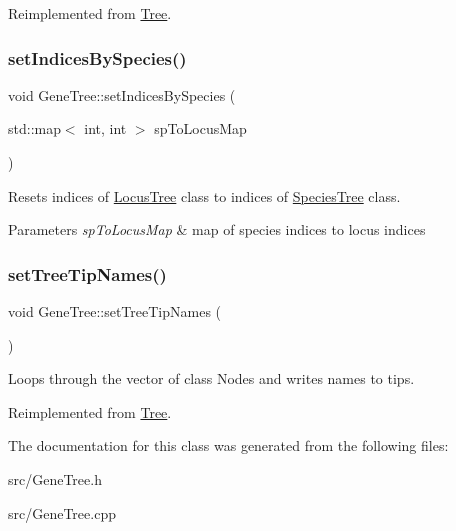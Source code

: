 Reimplemented from \mbox{\hyperlink{class_tree}{Tree}}.

\mbox{\label{class_gene_tree_afa604551a08482b11d50f4cd65a96a2f}} 
\subsubsection{\texorpdfstring{setIndicesBySpecies()}{setIndicesBySpecies()}}
{\footnotesize\ttfamily void Gene\+Tree\+::set\+Indices\+By\+Species (\begin{DoxyParamCaption}\item[{std\+::map$<$ int, int $>$}]{sp\+To\+Locus\+Map }\end{DoxyParamCaption})}



Resets indices of \mbox{\hyperlink{class_locus_tree}{Locus\+Tree}} class to indices of \mbox{\hyperlink{class_species_tree}{Species\+Tree}} class. 


\begin{DoxyParams}{Parameters}
{\em sp\+To\+Locus\+Map} & map of species indices to locus indices \\
\hline
\end{DoxyParams}
\mbox{\label{class_gene_tree_a7c67f2aa78bd6d46e6f1b2fede6c3284}} 
\subsubsection{\texorpdfstring{setTreeTipNames()}{setTreeTipNames()}}
{\footnotesize\ttfamily void Gene\+Tree\+::set\+Tree\+Tip\+Names (\begin{DoxyParamCaption}{ }\end{DoxyParamCaption})\hspace{0.3cm}{\ttfamily [virtual]}}



Loops through the vector of class Nodes and writes names to tips. 



Reimplemented from \mbox{\hyperlink{class_tree}{Tree}}.



The documentation for this class was generated from the following files\+:\begin{DoxyCompactItemize}
\item 
src/Gene\+Tree.\+h\item 
src/Gene\+Tree.\+cpp\end{DoxyCompactItemize}
